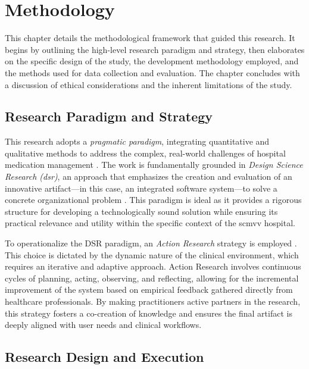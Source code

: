 \chapter{Methodology}
\label{chap:Methodology}

This chapter details the methodological framework that guided this research. It begins by outlining the high-level research paradigm and strategy, then elaborates on the specific design of the study, the development methodology employed, and the methods used for data collection and evaluation. The chapter concludes with a discussion of ethical considerations and the inherent limitations of the study.

\section{Research Paradigm and Strategy}

This research adopts a \textit{pragmatic paradigm}, integrating quantitative and qualitative methods to address the complex, real-world challenges of hospital medication management \cite{venkatesh2003}. The work is fundamentally grounded in \textit{Design Science Research (\gls{dsr})}, an approach that emphasizes the creation and evaluation of an innovative artifact—in this case, an integrated software system—to solve a concrete organizational problem \cite{martin2017}. This paradigm is ideal as it provides a rigorous structure for developing a technologically sound solution while ensuring its practical relevance and utility within the specific context of the \gls{scmvv} hospital.

To operationalize the DSR paradigm, an \textit{Action Research} strategy is employed \cite{greenhalgh2017}. This choice is dictated by the dynamic nature of the clinical environment, which requires an iterative and adaptive approach. Action Research involves continuous cycles of planning, acting, observing, and reflecting, allowing for the incremental improvement of the system based on empirical feedback gathered directly from healthcare professionals. By making practitioners active partners in the research, this strategy fosters a co-creation of knowledge and ensures the final artifact is deeply aligned with user needs and clinical workflows.

\section{Research Design and Execution}

